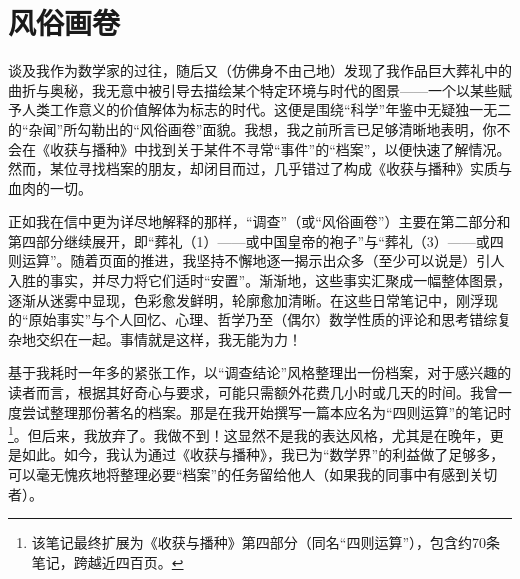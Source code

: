 
\section{风俗画卷}

谈及我作为数学家的过往，随后又（仿佛身不由己地）发现了我作品巨大葬礼中的曲折与奥秘，我无意中被引导去描绘某个特定环境与时代的图景——一个以某些赋予人类工作意义的价值解体为标志的时代。这便是围绕“科学”年鉴中无疑独一无二的“杂闻”所勾勒出的“风俗画卷”面貌。我想，我之前所言已足够清晰地表明，你不会在《收获与播种》中找到关于某件不寻常“事件”的“档案”，以便快速了解情况。然而，某位寻找档案的朋友，却闭目而过，几乎错过了构成《收获与播种》实质与血肉的一切。

正如我在信中更为详尽地解释的那样，“调查”（或“风俗画卷”）主要在第二部分和第四部分继续展开，即“葬礼（1）——或中国皇帝的袍子”与“葬礼（3）——或四则运算”。随着页面的推进，我坚持不懈地逐一揭示出众多（至少可以说是）引人入胜的事实，并尽力将它们适时“安置”。渐渐地，这些事实汇聚成一幅整体图景，逐渐从迷雾中显现，色彩愈发鲜明，轮廓愈加清晰。在这些日常笔记中，刚浮现的“原始事实”与个人回忆、心理、哲学乃至（偶尔）数学性质的评论和思考错综复杂地交织在一起。事情就是这样，我无能为力！

基于我耗时一年多的紧张工作，以“调查结论”风格整理出一份档案，对于感兴趣的读者而言，根据其好奇心与要求，可能只需额外花费几小时或几天的时间。我曾一度尝试整理那份著名的档案。那是在我开始撰写一篇本应名为“四则运算”的笔记时\footnote{该笔记最终扩展为《收获与播种》第四部分（同名“四则运算”），包含约70条笔记，跨越近四百页。}。但后来，我放弃了。我做不到！这显然不是我的表达风格，尤其是在晚年，更是如此。如今，我认为通过《收获与播种》，我已为“数学界”的利益做了足够多，可以毫无愧疚地将整理必要“档案”的任务留给他人（如果我的同事中有感到关切者）。